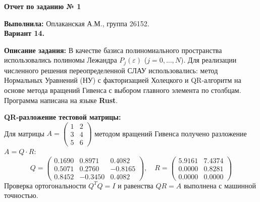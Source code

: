 \documentclass[a4paper,12pt]{article}
\begin{document}
	
	\begin{center}
		\textbf{\Large Отчет по заданию № 1}
	\end{center}
	
	\vspace{0.5em}
	\noindent \textbf{Выполнила:} Оплаканская А.М., группа 26152. \\
	\textbf{Вариант 14.}
	
	\vspace{1em}
	\noindent \textbf{Описание задания:} В качестве базиса полиномиального пространства использовались полиномы Лежандра $P_j(\varepsilon)$ ($j = 0, \dots, N$). Для реализации численного решения переопределенной СЛАУ использовались: метод Нормальных Уравнений (НУ) с факторизацией Холецкого и QR-алгоритм на основе метода вращений Гивенса с выбором главного элемента по столбцам. Программа написана на языке \textbf{Rust}.
	
	\vspace{1em}
	\noindent \textbf{QR-разложение тестовой матрицы:} \\
	Для матрицы $A = \begin{pmatrix} 1 & 2 \\ 3 & 4 \\ 5 & 6 \end{pmatrix}$ методом вращений Гивенса получено разложение $A = Q \cdot R$:
	\[
	Q = \begin{pmatrix} 
		0.1690 & 0.8971 & 0.4082 \\ 
		0.5071 & 0.2760 & -0.8165 \\ 
		0.8452 & -0.3450 & 0.4082 
	\end{pmatrix}, \quad
	R = \begin{pmatrix} 
		5.9161 & 7.4374 \\ 
		0.0000 & 0.8281 \\ 
		0.0000 & 0.0000 
	\end{pmatrix}
	\]
	Проверка ортогональности $Q^T Q = I$ и равенства $Q R = A$ выполнена с машинной точностью.
	
\end{document}
